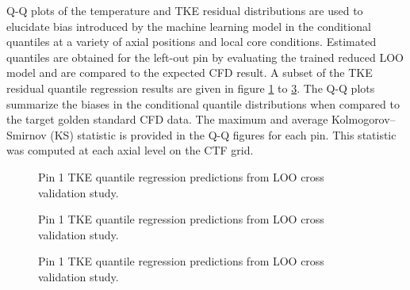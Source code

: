 Q-Q plots of the  temperature and TKE residual distributions are used to elucidate bias introduced by the machine learning model in the conditional quantiles at a variety of axial positions and local core conditions.  Estimated quantiles are obtained for the left-out pin by evaluating the trained reduced LOO model and are compared to the expected CFD result.
A subset of the TKE residual quantile regression results are given in figure \ref{fig:tkepin1} to \ref{fig:tkepin3}.  The Q-Q plots summarize the biases in the conditional quantile distributions when compared to the target golden standard CFD data.  The maximum and average Kolmogorov–Smirnov (KS) statistic is provided in the Q-Q figures for each pin.  This statistic was computed at each axial level on the CTF grid.

\begin{figure}[H]%
    \centering
    \qquad
    \caption[Q-Q LOO TKE pin 1 results.]{Pin 1 TKE quantile regression predictions from LOO cross validation study.}%
    \label{fig:tkepin1}%
\end{figure}

\begin{figure}[H]%
    \centering
    \qquad
    \caption[Q-Q LOO TKE pin 2 results.]{Pin 1 TKE quantile regression predictions from LOO cross validation study.}%
    \label{fig:tkepin2}%
\end{figure}

\begin{figure}[H]%
    \centering
    \qquad
    \caption[Q-Q LOO TKE pin 3 results.]{Pin 1 TKE quantile regression predictions from LOO cross validation study.}%
    \label{fig:tkepin3}%
\end{figure}


